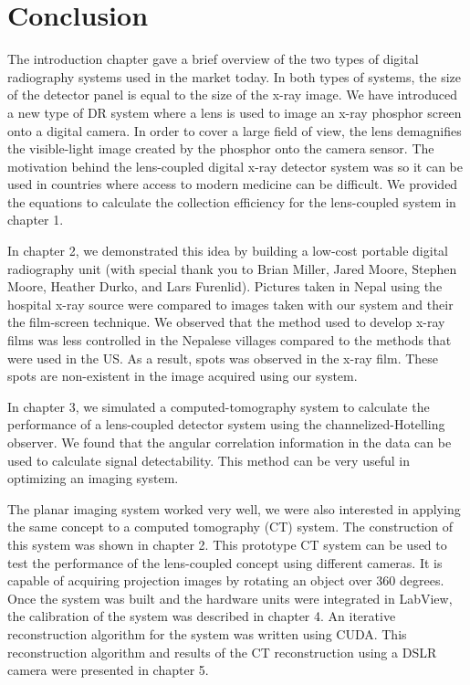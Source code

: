 \chapter{Conclusion}
The introduction chapter gave a brief overview of the two types of digital radiography systems used in the market today.  In both types of systems, the size of the detector panel is equal to the size of the x-ray image.  We have introduced a new type of DR system where a lens is used to image an x-ray phosphor screen onto a digital camera.  In order to cover a large field of view, the lens demagnifies the visible-light image created by the phosphor onto the camera sensor.  The motivation behind the lens-coupled digital x-ray detector system was so it can be used in countries where access to modern medicine can be difficult.  We provided the equations to calculate the collection efficiency for the lens-coupled system in chapter 1.  

In chapter 2, we demonstrated this idea by building a low-cost portable digital radiography unit (with special thank you to Brian Miller, Jared Moore, Stephen Moore, Heather Durko, and Lars Furenlid).  Pictures taken in Nepal using the hospital x-ray source were compared to images taken with our system and their the film-screen technique.  We observed that the method used to develop x-ray films was less controlled in the Nepalese villages compared to the methods that were used in the US.  As a result, spots was observed in the x-ray film.  These spots are non-existent in the image acquired using our system.  

In chapter 3, we simulated a computed-tomography system to calculate the performance of a lens-coupled detector system using the channelized-Hotelling observer.  We found that the angular correlation information in the data can be used to calculate signal detectability.  This method can be very useful in optimizing an imaging system.  

The planar imaging system worked very well, we were also interested in applying the same concept to a computed tomography (CT) system.  The construction of this system was shown in chapter 2.  This prototype CT system can be used to test the performance of the lens-coupled concept using different cameras.  It is capable of acquiring projection images by rotating an object over 360 degrees.  Once the system was built and the hardware units were integrated in LabView, the calibration of the system was described in chapter 4.  An iterative reconstruction algorithm for the system was written using CUDA.  This reconstruction algorithm and results of the CT reconstruction using a DSLR camera were presented in chapter 5.  

